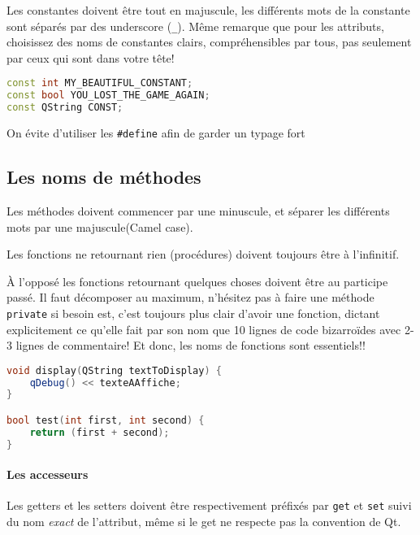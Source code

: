 Les constantes doivent être tout en majuscule, les différents mots de la
constante sont séparés par des underscore (\texttt{\_}). Même remarque que pour
les attributs, choisissez des noms de constantes clairs, compréhensibles
par tous, pas seulement par ceux qui sont dans votre tête!

\begin{lstlisting}[language=C++]
const int MY_BEAUTIFUL_CONSTANT; 
const bool YOU_LOST_THE_GAME_AGAIN; 
const QString CONST;
\end{lstlisting}

\begin{exemple}
	On évite d'utiliser les \texttt{\#define} afin de garder un typage fort
\end{exemple}

\subsection{Les noms de méthodes}\label{les-noms-de-muxe9thodes}

Les méthodes doivent commencer par une minuscule, et séparer les
différents mots par une majuscule(Camel case).

Les fonctions ne retournant rien (procédures) doivent toujours être à
l'infinitif.

\`A l'opposé les fonctions 
retournant quelques choses doivent être au
participe passé. Il faut décomposer au maximum, n'hésitez pas à faire
une méthode \texttt{private} si besoin est, c'est toujours plus clair
d'avoir une fonction, dictant explicitement ce qu'elle fait par son nom
que 10 lignes de code bizarroïdes avec 2-3 lignes de commentaire! Et donc, les noms de fonctions sont essentiels!!

\begin{lstlisting}[language=C++]
void display(QString textToDisplay) { 
    qDebug() << texteAAffiche; 
}

bool test(int first, int second) { 
	return (first + second);
} 
\end{lstlisting}

\paragraph{Les accesseurs}\label{les-accesseurs}

Les getters et les setters doivent être respectivement préfixés par
\texttt{get} et \texttt{set} suivi du nom \emph{exact} de l'attribut,
même si le get ne respecte pas la convention de Qt.

